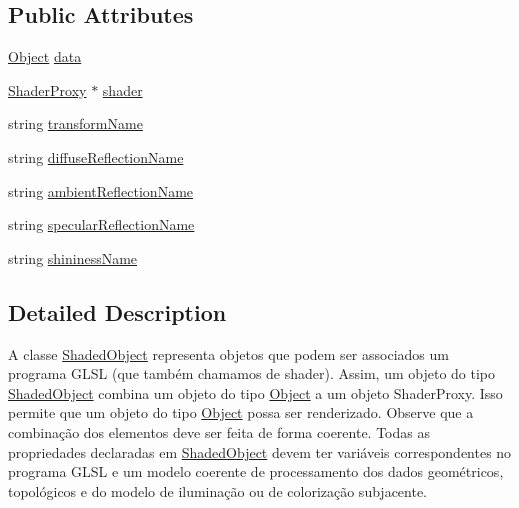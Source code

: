 \subsection*{Public Attributes}
\begin{DoxyCompactItemize}
\item 
\mbox{\hyperlink{classscene_1_1_object}{Object}} \mbox{\hyperlink{classscene_1_1_shaded_object_ad5127e62295e11f3ae4af42e2e517bff}{data}}
\item 
\mbox{\hyperlink{classshaderutils_1_1_shader_proxy}{Shader\+Proxy}} $\ast$ \mbox{\hyperlink{classscene_1_1_shaded_object_a4a7b0d0844a6fd186fff1b58c97adbfe}{shader}}
\item 
string \mbox{\hyperlink{classscene_1_1_shaded_object_a68adf6e1c31e6065c7a66e4959e147fe}{transform\+Name}}
\item 
string \mbox{\hyperlink{classscene_1_1_shaded_object_a71a51a5d138c364b956684a7e0394eac}{diffuse\+Reflection\+Name}}
\item 
string \mbox{\hyperlink{classscene_1_1_shaded_object_a7c49116b11a05b9a7eed925e83e27ee4}{ambient\+Reflection\+Name}}
\item 
string \mbox{\hyperlink{classscene_1_1_shaded_object_a957ab48c3aaa1474bac1903c19c54af8}{specular\+Reflection\+Name}}
\item 
string \mbox{\hyperlink{classscene_1_1_shaded_object_a15626025c84615d9b67fb40a13496217}{shininess\+Name}}
\end{DoxyCompactItemize}


\subsection{Detailed Description}
A classe \mbox{\hyperlink{classscene_1_1_shaded_object}{Shaded\+Object}} representa objetos que podem ser associados um programa G\+L\+SL (que também chamamos de shader). Assim, um objeto do tipo \mbox{\hyperlink{classscene_1_1_shaded_object}{Shaded\+Object}} combina um objeto do tipo \mbox{\hyperlink{classscene_1_1_object}{Object}} a um objeto Shader\+Proxy. Isso permite que um objeto do tipo \mbox{\hyperlink{classscene_1_1_object}{Object}} possa ser renderizado. Observe que a combinação dos elementos deve ser feita de forma coerente. Todas as propriedades declaradas em \mbox{\hyperlink{classscene_1_1_shaded_object}{Shaded\+Object}} devem ter variáveis correspondentes no programa G\+L\+SL e um modelo coerente de processamento dos dados geométricos, topológicos e do modelo de iluminação ou de colorização subjacente. 

